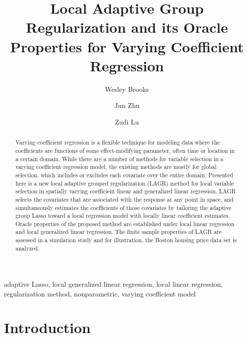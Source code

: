 \documentclass[authoryear,review, 12pt]{elsarticle}
\begin{document}
\begin{frontmatter}

\title{Local Adaptive Group Regularization and its Oracle Properties for Varying Coefficient Regression}


\author[wrbrooks]{Wesley Brooks}

\author[jzhu]{Jun Zhu}

\author[zlu]{Zudi Lu}

\address[wrbrooks]{Department of Statistics, University of Wisconsin, Madison, WI 53706}
\address[jzhu]{Department of Statistics, University of Wisconsin, Madison, WI 53706}
\address[zlu]{School of Mathematical Sciences, University of Southampton, Highfield, Southampton UK}

\begin{abstract}
Varying coefficient regression is a flexible technique for modeling data where the coefficients are functions of some effect-modifying parameter, often time or location in a certain domain. While there are a number of methods for variable selection in a varying coefficient regression model, the existing methods are mostly for global selection, which includes or excludes each covariate over the entire domain. Presented here is a new local adaptive grouped regularization (LAGR) method for local variable selection in spatially varying coefficient linear and generalized linear regression. LAGR selects the covariates that are associated with the response at any point in space, and simultaneously estimates the coefficients of those covariates by tailoring the adaptive group Lasso toward a local regression model with locally linear coefficient estimates. Oracle properties of the proposed method are established under local linear regression and local generalized linear regression. The finite sample properties of LAGR are assessed in a simulation study and for illustration, the Boston housing price data set is analyzed.
\end{abstract}

\begin{keyword}
adaptive Lasso, local generalized linear regression, local linear regression, regularization method, nonparametric, varying coefficient model
\end{keyword}

\end{frontmatter}

\section{Introduction}
\end{document}
